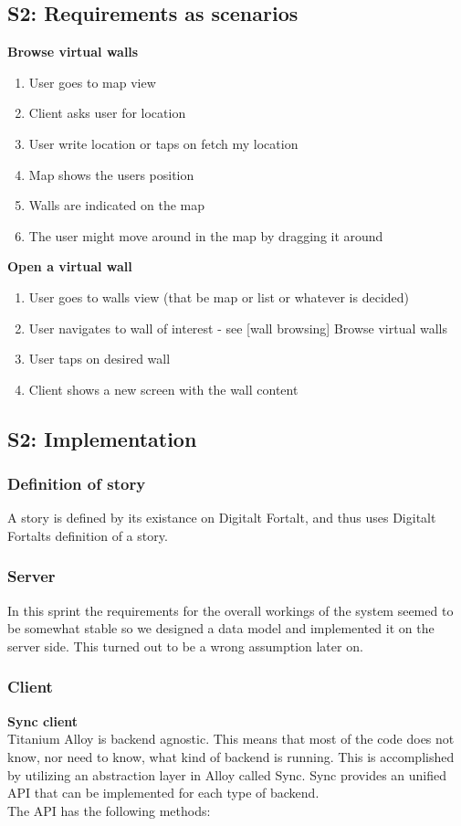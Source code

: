 \documentclass[11pt]{book}
\begin{document}
\subsection{S2: Requirements as scenarios}
\textbf{Browse virtual walls}
\begin{enumerate}
    \item User goes to map view
    \item Client asks user for location
    \item User write location or taps on fetch my location
    \item Map shows the users position
    \item Walls are indicated on the map
    \item The user might move around in the map by dragging it around
\end{enumerate}

\textbf{Open a virtual wall}
\begin{enumerate}
    \item User goes to walls view (that be map or list or whatever is decided)
    \item User navigates to wall of interest - see [wall browsing] Browse virtual walls
    \item User taps on desired wall
    \item Client shows a new screen with the wall content
\end{enumerate}

\subsection{S2: Implementation}

\subsubsection{Definition of story}
A story is defined by its existance on Digitalt Fortalt, and thus uses Digitalt Fortalts definition of a story.

\subsubsection{Server}

In this sprint the requirements for the overall workings of the system seemed to be somewhat stable so we designed a data model and implemented it on the server side. This turned out to be a wrong assumption later on.

\subsubsection{Client}
\textbf{Sync client}\\
Titanium Alloy is backend agnostic. This means that most of the code does not know, nor need to know, what kind of backend is running. This is accomplished by utilizing an abstraction layer in Alloy called Sync. Sync provides an unified API that can be implemented for each type of backend.\\
The API has the following methods:
\end{document}
